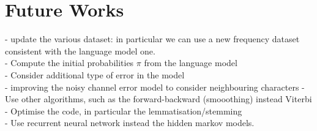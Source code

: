 
\section{Future Works}

- update the various dataset: in particular we can use a new frequency dataset consistent with the language model one.\\
- Compute the initial probabilities $\pi$ from the language model\\
- Consider additional type of error in the model\\
- improving the noisy channel error model to consider neighbouring characters
- Use other algorithms, such as the forward-backward (smooothing) instead Viterbi\\
- Optimise the code, in particular the lemmatisation/stemming \\
- Use recurrent neural network instead the hidden markov models.\\



